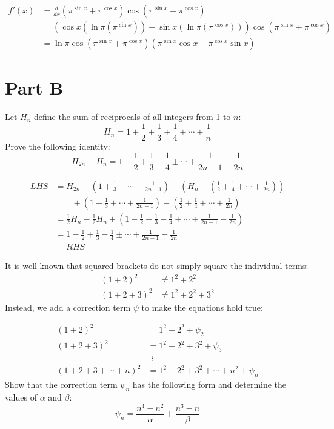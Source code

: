 \documentclass{article}
\begin{document}
\begin{solution}
\begin{align*}
    f'(x)&=\frac{d}{dx}\left(\pi^{\sin x}+\pi^{\cos x}\right)\cos\left(\pi^{\sin x}+\pi^{\cos x}\right)\\
    &=\left(\cos x\left(\ln \pi\left(\pi^{\sin x}\right)\right)-\sin x\left(\ln\pi\left(\pi^{\cos x}\right)\right)\right)\cos\left(\pi^{\sin x}+\pi^{\cos x}\right)\\
    &=\ln\pi\cos\left(\pi^{\sin x}+\pi^{\cos x}\right)\left(\pi^{\sin x}\cos x-\pi^{\cos x}\sin x\right)
\end{align*}
\end{solution}


\pagebreak
\section{Part B}
\begin{custom-big}[Problem B.1]
Let $H_n$ define the sum of reciprocals of all integers from 1 to $n$:
$$H_n=1+\frac 12+\frac 13+\frac 14+\cdots+\frac 1n$$
Prove the following identity:
$$H_{2n}-H_n=1-\frac 12+\frac 13-\frac 14\pm\cdots+\frac{1}{2n-1}-\frac{1}{2n}$$
\end{custom-big}

\begin{solution}
\begin{align*}
LHS &= H_{2n}-\left(1+\frac 13+\cdots+\frac{1}{2n-1}\right)-\left(H_n-\left(\frac 12+\frac 14+\cdots+ \frac{1}{2n}\right)\right)\\
      &\qquad + \left(1+\frac 13+\cdots+\frac{1}{2n-1}\right)-\left(\frac 12+\frac 14+\cdots+\frac{1}{2n}\right)\\
  &=\frac 12 H_n-\frac 12H_n+\left(1-\frac 12+\frac 13-\frac 14\pm\cdots+\frac{1}{2n-1}-\frac{1}{2n}\right)\\
  &=1-\frac 12+\frac 13-\frac 14\pm\cdots+\frac{1}{2n-1}-\frac{1}{2n}\\
  &=RHS
\end{align*}
\end{solution}

\begin{custom-big}[Problem B.2]
It is well known that squared brackets do not simply square the individual terms:
\begin{align*}
    (1+2)^2&\neq 1^2+2^2\\
    (1+2+3)^2&\neq 1^2+2^2+3^2
\end{align*}
Instead, we add a correction term $\psi$ to make the equations hold true:

\begin{align*}
    (1+2)^2&=1^2+2^2+\psi_2\\
    (1+2+3)^2&=1^2+2^2+3^2+\psi_3\\
    &\ \ \vdots\\
    (1+2+3+\cdots+n)^2&=1^2+2^2+3^2+\cdots+n^2+\psi_n
\end{align*}
Show that the correction term $\psi_n$ has the following form and determine the values of $\alpha$ and $\beta$:
\[
\psi_n=\frac{n^4-n^2}{\alpha}+\frac{n^3-n}{\beta}
\]
\end{custom-big}
\end{document}
